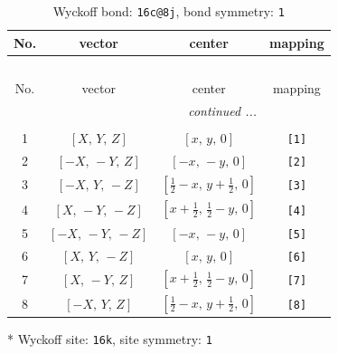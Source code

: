 \documentclass[fleqn,8pt]{jsarticle}
\begin{document}
\renewcommand{\arraystretch}{1.2}
\begin{longtable}{cccc}
\caption{Wyckoff bond: {\tt 16c@8j}, bond symmetry: {\tt 1}}
 \\
 \hline \hline
No. & vector & center & mapping \\ \hline \endfirsthead

\multicolumn{3}{l}{\tablename\ \thetable{}} \\
 \hline \hline
No. & vector & center & mapping \\ \hline \endhead

 \hline \hline
\multicolumn{3}{r}{\footnotesize\it continued ...} \\ \endfoot

 \hline \hline
\multicolumn{3}{r}{} \\ \endlastfoot

1 & $\left[ X,\, Y,\, Z \right]$ & $\left[ x,\, y,\, 0 \right]$ & {\tt [1]} \\ \hline
2 & $\left[ - X,\, - Y,\, Z \right]$ & $\left[ - x,\, - y,\, 0 \right]$ & {\tt [2]} \\ \hline
3 & $\left[ - X,\, Y,\, - Z \right]$ & $\left[ \frac{1}{2} - x,\, y + \frac{1}{2},\, 0 \right]$ & {\tt [3]} \\ \hline
4 & $\left[ X,\, - Y,\, - Z \right]$ & $\left[ x + \frac{1}{2},\, \frac{1}{2} - y,\, 0 \right]$ & {\tt [4]} \\ \hline
5 & $\left[ - X,\, - Y,\, - Z \right]$ & $\left[ - x,\, - y,\, 0 \right]$ & {\tt [5]} \\ \hline
6 & $\left[ X,\, Y,\, - Z \right]$ & $\left[ x,\, y,\, 0 \right]$ & {\tt [6]} \\ \hline
7 & $\left[ X,\, - Y,\, Z \right]$ & $\left[ x + \frac{1}{2},\, \frac{1}{2} - y,\, 0 \right]$ & {\tt [7]} \\ \hline
8 & $\left[ - X,\, Y,\, Z \right]$ & $\left[ \frac{1}{2} - x,\, y + \frac{1}{2},\, 0 \right]$ & {\tt [8]} \\
\end{longtable}
* Wyckoff site: {\tt 16k}, site symmetry: {\tt 1}
\renewcommand{\arraystretch}{1.2}
\end{document}
